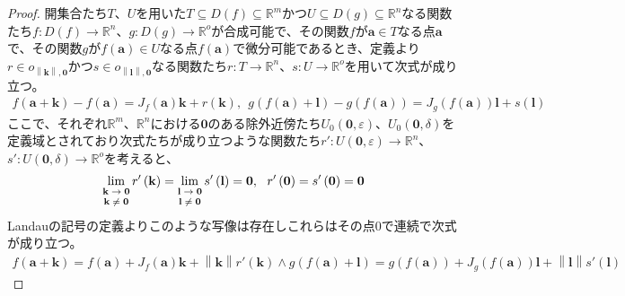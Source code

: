 \documentclass[dvipdfmx]{jsarticle}
\begin{document}
\begin{proof}
開集合たち$T$、$U$を用いた$T \subseteq D(f) \subseteq \mathbb{R}^{m}$かつ$U \subseteq D(g) \subseteq \mathbb{R}^{n}$なる関数たち$f:D(f) \rightarrow \mathbb{R}^{n}$、$g:D(g) \rightarrow \mathbb{R}^{o}$が合成可能で、その関数$f$が$\mathbf{a} \in T$なる点$\mathbf{a}$で、その関数$g$が$f\left( \mathbf{a} \right) \in U$なる点$f\left( \mathbf{a} \right)$で微分可能であるとき、定義より$r \in o_{\left\| \mathbf{k} \right\|,\mathbf{0}}$かつ$s \in o_{\left\| \mathbf{l} \right\|,\mathbf{0}}$なる関数たち$r:T \rightarrow \mathbb{R}^{n}$、$s:U \rightarrow \mathbb{R}^{o}$を用いて次式が成り立つ。
\begin{align*}
f\left( \mathbf{a} + \mathbf{k} \right) - f\left( \mathbf{a} \right) = J_{f}\left( \mathbf{a} \right)\mathbf{k} + r\left( \mathbf{k} \right),\ \ g\left( f\left( \mathbf{a} \right) + \mathbf{l} \right) - g\left( f\left( \mathbf{a} \right) \right) = J_{g}\left( f\left( \mathbf{a} \right) \right)\mathbf{l} + s\left( \mathbf{l} \right)
\end{align*}
ここで、それぞれ$\mathbb{R}^{m}$、$\mathbb{R}^{n}$における$\mathbf{0}$のある除外近傍たち$U_{0}\left( \mathbf{0},\varepsilon \right)$、$U_{0}\left( \mathbf{0},\delta \right)$を定義域とされており次式たちが成り立つような関数たち$r':U\left( \mathbf{0},\varepsilon \right) \rightarrow \mathbb{R}^{n}$、$s':U\left( \mathbf{0},\delta \right) \rightarrow \mathbb{R}^{o}$を考えると、
\begin{align*}
\lim_{\scriptsize \begin{matrix}
\mathbf{k} \rightarrow \mathbf{0} \\
\mathbf{k} \neq \mathbf{0} \\
\end{matrix}}{r'\left( \mathbf{k} \right)} = \lim_{\scriptsize \begin{matrix}
\mathbf{l} \rightarrow \mathbf{0} \\
\mathbf{l} \neq \mathbf{0} \\
\end{matrix}}{s'\left( \mathbf{l} \right)} = \mathbf{0},\ \ r'\left( \mathbf{0} \right) = s'\left( \mathbf{0} \right) = \mathbf{0}
\end{align*}
Landauの記号の定義よりこのような写像は存在しこれらはその点$0$で連続で次式が成り立つ。
\begin{align*}
f\left( \mathbf{a} + \mathbf{k} \right) = f\left( \mathbf{a} \right) + J_{f}\left( \mathbf{a} \right)\mathbf{k} + \left\| \mathbf{k} \right\| r'\left( \mathbf{k} \right) \land g\left( f\left( \mathbf{a} \right) + \mathbf{l} \right) = g\left( f\left( \mathbf{a} \right) \right) + J_{g}\left( f\left( \mathbf{a} \right) \right)\mathbf{l} + \left\| \mathbf{l} \right\| s'\left( \mathbf{l} \right)

\end{align*}
\end{proof}
\end{document}

